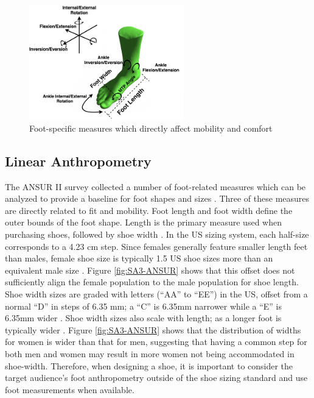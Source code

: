\documentclass[defaultstyle,11pt]{thesis}
\begin{document}
\begin{figure}
\hypertarget{fig:SA3-Foot}{%
\centering
\includegraphics[width=0.6\textwidth,height=\textheight]{../fig/SA3/FootOverview.png}
\caption{Foot-specific measures which directly affect mobility and comfort}\label{fig:SA3-Foot}
}
\end{figure}

\hypertarget{linear-anthropometry}{%
\subsection{Linear Anthropometry}\label{linear-anthropometry}}

The ANSUR II survey collected a number of foot-related measures which can be analyzed to provide a baseline for foot shapes and sizes \citep{Gordon2014}.
Three of these measures are directly related to fit and mobility.
Foot length and foot width define the outer bounds of the foot shape.
Length is the primary measure used when purchasing shoes, followed by shoe width \citep{Luximon2013}.
In the US sizing system, each half-size corresponds to a 4.23 cm step.
Since females generally feature smaller length feet than males, female shoe size is typically 1.5 US shoe sizes more than an equivalent male size \citep{Luximon2013}.
Figure \ref{fig:SA3-ANSUR} shows that this offset does not sufficiently align the female population to the male population for shoe length.
Shoe width sizes are graded with letters (``AA'' to ``EE'') in the US, offset from a normal ``D'' in steps of 6.35 mm; a ``C'' is 6.35mm narrower while a ``E'' is 6.35mm wider \citep{Luximon2013}.
Shoe width sizes also scale with length; as a longer foot is typically wider \citep{Jurca2019}.
Figure \ref{fig:SA3-ANSUR} shows that the distribution of widths for women is wider than that for men, suggesting that having a common step for both men and women may result in more women not being accommodated in shoe-width.
Therefore, when designing a shoe, it is important to consider the target audience's foot anthropometry outside of the shoe sizing standard and use foot measurements when available.
\end{document}
